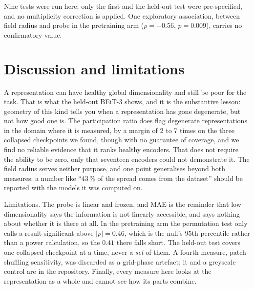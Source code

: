 \documentclass{esannV2}
\begin{document}
Nine tests were run here; only the first and the held-out test were
pre-specified, and no multiplicity correction is applied. One exploratory
association, between field radius and probe in the pretraining arm
($\rho = +0.56$, $p = 0.009$), carries no confirmatory value.

\section{Discussion and limitations}

A representation can have healthy global dimensionality and still be poor for
the task. That is what the held-out BEiT-3 shows, and it is the substantive
lesson: geometry of this kind tells you when a representation has gone
degenerate, but not how good one is. The participation ratio does flag
degenerate representations in the domain where it is measured, by a margin of 2
to 7 times on the three collapsed checkpoints we found, though with no
guarantee of coverage, and we find no reliable evidence that it ranks healthy
encoders. That does not require the ability to be zero, only that seventeen
encoders could not demonstrate it. The field radius serves neither purpose, and
one point generalises beyond both measures: a number like ``43\,\% of the
spread comes from the dataset'' should be reported with the models it was
computed on.

Limitations. The probe is linear and frozen, and MAE is the reminder that low
dimensionality says the information is not linearly accessible, and says
nothing about whether it is there at all. In the pretraining arm the permutation test only calls a result
significant above $|\rho| = 0.46$, which is the null's 95th percentile rather
than a power calculation, so the $0.41$ there falls short. The held-out test covers one
collapsed checkpoint at a time, never a \emph{set} of them. A fourth measure,
patch-shuffling sensitivity, was discarded as a grid-phase artefact; it and a
greyscale control are in the repository. Finally, every measure here looks at
the representation as a whole and cannot see how its parts combine.
\end{document}
